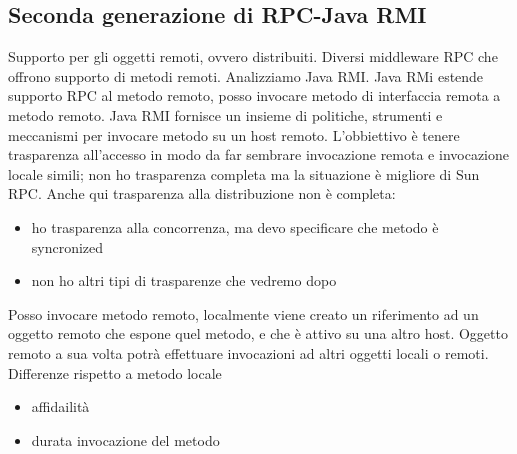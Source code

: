 \documentclass[16px]{article}
\begin{document}
\subsection{Seconda generazione di RPC-Java RMI}
Supporto per gli oggetti remoti, ovvero distribuiti. Diversi middleware RPC che offrono supporto di metodi remoti. Analizziamo Java RMI. Java RMi estende supporto RPC al metodo remoto, posso invocare metodo di interfaccia remota a metodo remoto. Java RMI fornisce un insieme di politiche, strumenti e meccanismi per invocare metodo su un host remoto. L'obbiettivo è tenere trasparenza all'accesso in modo da far sembrare invocazione remota e invocazione locale simili; non ho trasparenza completa ma la situazione è migliore di Sun RPC. Anche qui trasparenza alla distribuzione non è completa:
\begin{itemize}
\item ho trasparenza alla concorrenza, ma devo specificare che metodo è syncronized
\item non ho altri tipi di trasparenze che vedremo dopo
\end{itemize}
Posso invocare metodo remoto, localmente viene creato un riferimento ad un oggetto remoto che espone quel metodo, e che è attivo su una altro host. Oggetto remoto a sua volta potrà effettuare invocazioni ad altri oggetti locali o remoti. Differenze rispetto a metodo locale
\begin{itemize}
\item affidailità
\item durata invocazione del metodo
\end{itemize}
\end{document}
